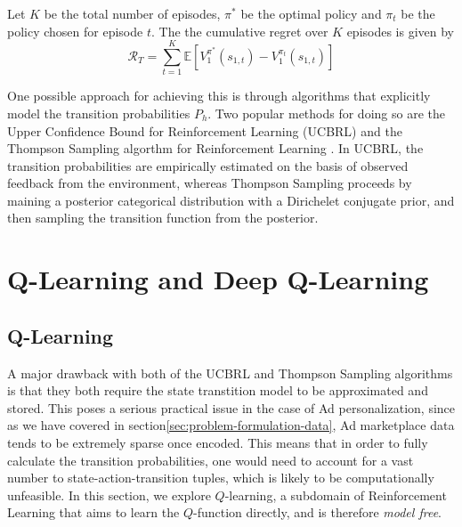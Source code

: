\documentclass{mldsmsc}
\begin{document}
\begin{definition}\label{def:regret}
Let $K$ be the total number of episodes, $\pi^*$ be the optimal policy and $\pi_t$ be
the policy chosen for episode $t$. The the cumulative regret over $K$ episodes is given by
\begin{equation}
    \mathcal{R}_T = \sum_{t=1}^K \mathbb{E}\left[ V_1^{\pi^*}(s_{1,t}) - V_1^{\pi_t}(s_{1,t})\right]
\end{equation}
\end{definition}

One possible approach for achieving this is through algorithms that explicitly model the transition
probabilities $P_h$. Two popular methods for doing so are the Upper Confidence Bound for Reinforcement Learning (UCBRL)
\citep{RefWorks:auer2008near-optimal} and the Thompson Sampling algorthm for Reinforcement
Learning \citep{RefWorks:pike-burke2024optimism/thompson}. In UCBRL, the transition probabilities
are empirically estimated on the basis of observed feedback from the environment, whereas Thompson
Sampling proceeds by maining a posterior categorical distribution with a Dirichelet conjugate prior,
and then sampling the transition function from the posterior.

\section{Q-Learning and Deep Q-Learning}

\subsection{Q-Learning}

A major drawback with both of the UCBRL and Thompson Sampling algorithms is that they both
require the state transtition model to be approximated and stored. This poses a serious practical
issue in the case of Ad personalization, since as we have covered in section\ref{sec:problem-formulation-data},
Ad marketplace data tends to be extremely sparse once encoded. This means that in order to fully
calculate the transition probabilities, one would need to account for a vast number to state-action-transition
tuples, which is likely to be computationally unfeasible. In this section, we explore $Q$-learning,
a subdomain of Reinforcement Learning that aims to learn the $Q$-function directly, and is therefore 
\emph{model free}.
\end{document}
